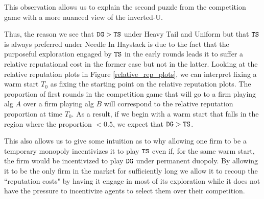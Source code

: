 \documentclass[../competing_bandits.tex]{subfiles}
\begin{document}
This observation allows us to explain the second puzzle from the competition game with a more nuanced view of the inverted-U.


Thus, the reason we see that $\mathtt{DG} > \mathtt{TS}$ under Heavy Tail and Uniform but that $\mathtt{TS}$ is always preferred under Needle In Haystack is due to the fact that the purposeful exploration engaged by $\mathtt{TS}$ in the early rounds leads it to suffer a relative reputational cost in the former case but not in the latter. Looking at the relative reputation plots in Figure \ref{relative_rep_plots}, we can interpret fixing a warm start $T_0$ as fixing the starting point on the relative reputation plots. The proportion of first rounds in the competition game that will go to a firm playing alg $A$ over a firm playing alg $B$ will correspond to the relative reputation proportion at time $T_0$. As a result, if we begin with a warm start that falls in the region where the proportion $< 0.5$, we expect that $\mathtt{DG} > \mathtt{TS}$.

This also allows us to give some intuition as to why allowing one firm to be a temporary monopoly incentivizes it to play $\mathtt{TS}$ even if, for the same warm start, the firm would be incentivized to play $\mathtt{DG}$ under permanent duopoly.  By allowing it to be the only firm in the market for sufficiently long we allow it to recoup the ``reputation costs" by having it engage in most of its exploration while it does not have the pressure to incentivize agents to select them over their competition.
\end{document}

